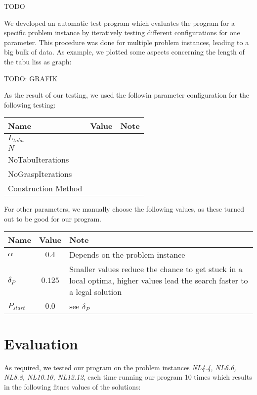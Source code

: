 \documentclass[a4paper,11pt]{article}
\begin{document}
TODO

We developed an automatic test program which evaluates the program for a specific problem instance 
by iteratively testing different configurations for one parameter. This procedure was done for multiple problem instances, leading to a big bulk of data.
As example, we plotted some aspects concerning the length of the tabu liss as graph:

TODO: GRAFIK

As the result of our testing, we used the followin parameter configuration for the following testing:

\begin{center}
\begin{tabularx}{\linewidth}{| l | c | X | }
  \hline                       
  Name & Value & Note \\   \hline     \hline    
  $L_{tabu}$ &&  \\ \hline    
  $N$ &  &  \\ \hline   
  NoTabuIterations &   &\\ \hline  
  NoGraspIterations &   &  \\ \hline 
  Construction Method &   & \\ \hline 

\end{tabularx}
\end{center}

For other parameters, we manually choose the following values, as these turned out to be good for our program.
\begin{center}
\begin{tabularx}{\linewidth}{| l | c | X | }
  \hline                       
  Name & Value & Note \\   \hline     \hline    
  $\alpha$ & $0.4$ & Depends on the problem instance \\ \hline    
  $ \delta_P $ & $ 0.125 $ & Smaller values reduce the chance to get stuck in a local optima, higher values lead the search faster to a legal solution \\ \hline    
  $P_{start}$ & $0.0$ & see $ \delta_P $ \\ \hline    
\end{tabularx}
\end{center}

\section{Evaluation}
As required, we tested our program on the problem instances 
\emph{NL4.4, NL6.6, NL8.8, NL10.10, NL12.12},
 each time running our program 10 times which results in the following fitnes values of the
solutions:
\end{document}
